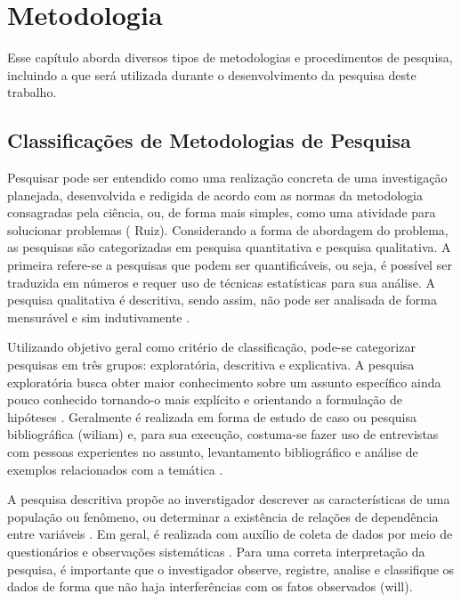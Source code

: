 \chapter[Metodologia]{Metodologia}

Esse capítulo aborda diversos tipos de metodologias e procedimentos de pesquisa, incluindo a que será utilizada durante o desenvolvimento da pesquisa deste trabalho. 

 \section{Classificações de Metodologias de Pesquisa}
  
Pesquisar pode ser entendido como uma realização concreta de uma investigação planejada, desenvolvida e redigida de acordo com as normas da metodologia consagradas pela ciência, ou, de forma mais simples, como uma atividade para solucionar problemas \cite{kauark_2010} ( Ruiz). Considerando a forma de abordagem do problema, as pesquisas são categorizadas em pesquisa quantitativa e pesquisa qualitativa. A primeira refere-se a pesquisas que podem ser quantificáveis, ou seja, é possível ser traduzida em números e requer uso de técnicas estatísticas para sua análise. A pesquisa qualitativa é descritiva, sendo assim, não pode ser analisada de forma mensurável e sim indutivamente \cite{kauark_2010}.

 \par
  \indent Utilizando objetivo geral como critério de classificação, pode-se categorizar pesquisas em três grupos: exploratória, descritiva e explicativa. A pesquisa exploratória busca obter maior conhecimento sobre um assunto específico ainda pouco conhecido tornando-o mais explícito e orientando a formulação de hipóteses \cite{gil_2002}. Geralmente é realizada em forma de estudo de caso ou pesquisa bibliográfica (wiliam) e, para sua execução, costuma-se fazer uso de entrevistas com pessoas experientes no assunto, levantamento bibliográfico e análise de exemplos relacionados com a temática \cite{gil_2002}. 

 \par
  \indent A pesquisa descritiva propõe ao inverstigador descrever as características de uma população ou fenômeno, ou determinar a existência de relações de dependência entre variáveis \cite{gil_2002}.  Em geral, é realizada com auxílio de coleta de dados por meio de questionários e observações sistemáticas \cite{tafner_2007}. Para uma correta interpretação da pesquisa, é importante que o investigador observe, registre, analise e classifique os dados de forma que não haja interferências com os fatos observados (will). 

